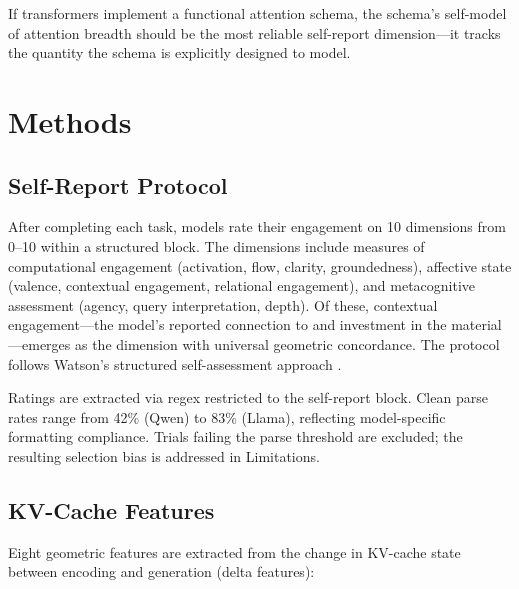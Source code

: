 \documentclass[11pt,a4paper]{article}
\begin{document}
If transformers implement a functional attention schema, the schema's self-model of attention breadth should be the most reliable self-report dimension---it tracks the quantity the schema is explicitly designed to model.

\section{Methods}

\subsection{Self-Report Protocol}

After completing each task, models rate their engagement on 10 dimensions from 0--10 within a structured block. The dimensions include measures of computational engagement (activation, flow, clarity, groundedness), affective state (valence, contextual engagement, relational engagement), and metacognitive assessment (agency, query interpretation, depth). Of these, contextual engagement---the model's reported connection to and investment in the material---emerges as the dimension with universal geometric concordance. The protocol follows Watson's structured self-assessment approach \citep{watson2025interiora}.

Ratings are extracted via regex restricted to the self-report block. Clean parse rates range from 42\% (Qwen) to 83\% (Llama), reflecting model-specific formatting compliance. Trials failing the parse threshold are excluded; the resulting selection bias is addressed in Limitations.

\subsection{KV-Cache Features}

Eight geometric features are extracted from the change in KV-cache state between encoding and generation (delta features):
\end{document}
